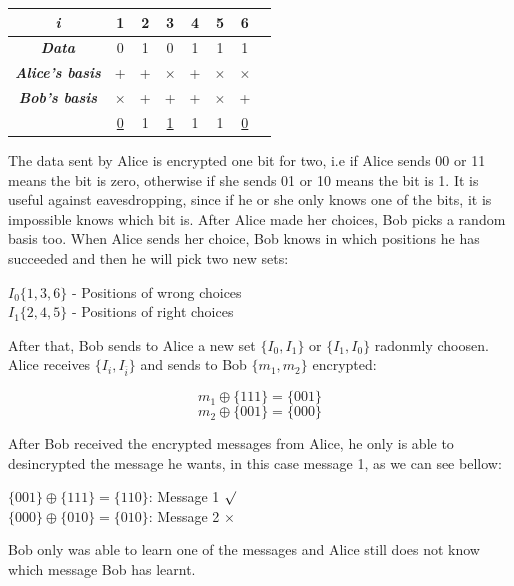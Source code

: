 \begin{table}[H]
\centering
\begin{tabular}{c|c|c|c|c|c|c|c}
\textbf{\textit{i}}         & 1 & 2 & 3 & 4 & 5 & 6      \\ \hline
\textbf{\textit{Data}}  & 0 & 1 & 0 & 1 & 1 & 1     \\ \hline
\textbf{\textit{Alice's basis}} & + & + & $\times$ &+ & $\times$ & $\times$ \\ \hline
\textbf{\textit{Bob's basis}} & $\times$ & + & + &+ & $\times$ & + \\ \hline

		 & \underline{0} & 1 & \underline{1} & 1 & 1 & \underline{0} \\ \hline
\end{tabular}
\end{table}

The data sent by Alice is encrypted one bit for two, i.e if Alice sends 00 or 11 means the bit is zero, otherwise if she sends 01 or 10 means the bit is 1. It is useful against eavesdropping, since if he or she only knows one of the bits, it is impossible knows which bit is.
After Alice made her choices, Bob picks a random basis too. When Alice sends her choice, Bob knows in which positions he has succeeded and then he will pick two new sets:

\begin{center}
$I_{0} \{ 1,3,6 \}$ - Positions of wrong choices\\
$I_{1} \{ 2,4,5 \}$ - Positions of right choices
\end{center}

After that, Bob sends to Alice a new set $ \{ I_{0},I_{1} \}$ or $\{ I_{1}, I_{0}\}$ radonmly choosen. Alice receives $\{ I_{i}, I_{\bar{i}}\}$ and sends to Bob $\{ m_{1}, m_{2}\}$ encrypted:

$$m_{1} \oplus{} \{ 1 1 1 \} = \{ 0 0 1\}$$
$$m_{2} \oplus{} \{ 0 0 1 \} = \{ 0 0 0\}$$

After Bob received the encrypted messages from Alice, he only is able to desincrypted the message he wants, in this case message 1, as we can see bellow:
\begin{center}
$\{ 0 0 1\} \oplus{} \{ 1 1 1\} = \{ 1 1 0\} $: Message 1 $\surd$ \\
$\{ 0 0 0\} \oplus{} \{ 0 1 0\} = \{ 0 1 0\} $: Message 2 $\times$ \\
\end{center}

Bob only was able to learn one of the messages and Alice still does not know which message Bob has learnt.

